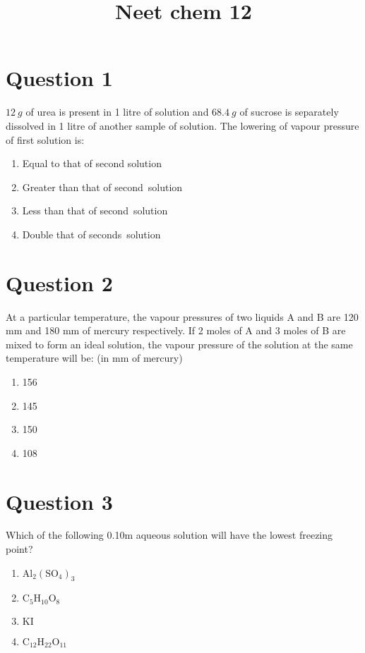 \documentclass{article}
\title{Neet chem 12}
\begin{document}
                    \maketitle
                    \section*{Question 1}
\(12 {~g}\) of urea is present in 1 litre of solution and \(68.4 {~g}\) of sucrose is separately dissolved in 1 litre of another sample of solution. The lowering of vapour pressure of first solution is:
\begin{enumerate}[label=(\alph*)]
\item Equal to that of second solution
\item Greater than that of second solution
\item Less than that of second solution
\item Double that of seconds solution
\end{enumerate}
\newpage
\section*{Question 2}
At a particular temperature, the vapour pressures of two liquids A and B are 120 mm and 180 mm of mercury respectively. If 2 moles of A and 3 moles of B are mixed to form an ideal solution, the vapour pressure of the solution at the same temperature will be: (in mm of mercury)
\begin{enumerate}[label=(\alph*)]
\item 156
\item 145
\item 150
\item 108
\end{enumerate}
\newpage
\section*{Question 3}
Which of the following 0.10m aqueous solution will have the lowest freezing point?
\begin{enumerate}[label=(\alph*)]
\item \(\mathrm{Al}_{2}\left(\mathrm{SO}_{4}\right)_{3}\)
\item \(\mathrm{C}_{5} \mathrm{H}_{10} \mathrm{O}_{8}\)
\item \(\mathrm{KI}\)
\item \(\mathrm{C}_{12} \mathrm{H}_{22} \mathrm{O}_{11}\)
\end{enumerate}
\newpage
\end{document}
